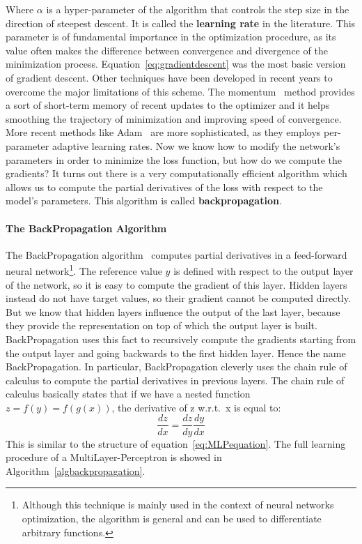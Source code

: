\documentclass[../main.tex]{subfiles}
\begin{document}
    Where $\alpha$ is a hyper-parameter of the algorithm that controls the step size in the direction of steepest descent. It is called the
    \textbf{learning rate} in the literature. This parameter is of fundamental importance in the optimization procedure, as its value often
    makes the difference between convergence and divergence of the minimization process. Equation~\eqref{eq:gradientdescent} was the most basic
    version of gradient descent. Other techniques have been developed in recent years to overcome the major limitations of this scheme.
    The momentum~\cite{momentum} method provides a sort of short-term memory of recent updates to the optimizer and it helps smoothing the
    trajectory of minimization and improving speed of convergence. More recent methods like Adam~\cite{adam} are more sophisticated, as
    they employs per-parameter adaptive learning rates.
	\newline
    Now we know how to modify the network's parameters in order to minimize the loss function, but how do we compute the gradients?
    It turns out there is a very computationally efficient algorithm which allows us to compute the partial derivatives of the loss with
    respect to the model's parameters. This algorithm is called \textbf{backpropagation}.

    \paragraph{The BackPropagation Algorithm}
    The BackPropagation algorithm~\cite{backprop} computes partial derivatives in a feed-forward neural network\footnote{Although this
	technique is mainly used in the context of neural networks optimization, the algorithm is general and can be used to differentiate
	arbitrary functions.}.
	\newline
	The reference value $y$ is defined with respect to the output layer of the network, so it is easy to compute the gradient of this
	layer. Hidden layers instead do not have target values, so their gradient cannot be computed directly. But we know that hidden layers
	influence the output of the last layer, because they provide the representation on top of which the output layer is built. BackPropagation
	uses this fact to recursively compute the gradients starting from the output layer and going backwards to the first hidden layer. Hence the
	name BackPropagation. In particular, BackPropagation cleverly uses the chain rule of calculus to compute the partial derivatives
	in previous layers. The chain rule of calculus basically states that if we have a nested function
    $ z = f(y) = f(g(x)) $, the derivative of z w.r.t.\ x is equal to:
    $$ \frac{dz}{dx}  = \frac{dz}{dy} \frac{dy}{dx} $$
    This is similar to the structure of equation~\eqref{eq:MLPequation}. The full learning procedure of a MultiLayer-Perceptron is showed in Algorithm~\ref{algbackpropagation}.
\end{document}
